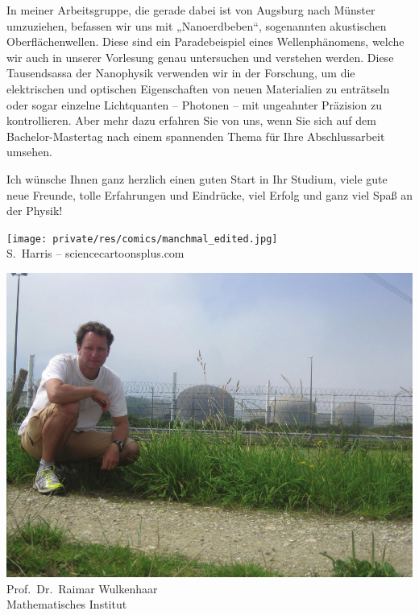 \begin{multicols}{2}
\begin{multicols}{2}
In meiner Arbeitsgruppe, die gerade dabei ist von Augsburg nach Münster umzuziehen, befassen wir uns mit „Nanoerdbeben“, sogenannten akustischen Oberflächenwellen. Diese sind ein Paradebeispiel eines Wellenphänomens, welche wir auch in unserer Vorlesung genau untersuchen und verstehen werden. Diese Tausendsassa der Nanophysik verwenden wir in der Forschung, um die elektrischen und optischen Eigenschaften von neuen Materialien zu enträtseln oder sogar einzelne Lichtquanten -- Photonen -- mit ungeahnter Präzision zu kontrollieren. Aber mehr dazu erfahren Sie von uns, wenn Sie sich auf dem Bachelor-Mastertag nach einem spannenden Thema für Ihre Abschlussarbeit umsehen. 🙂

Ich wünsche Ihnen ganz herzlich einen guten Start in Ihr Studium, viele gute neue Freunde, tolle Erfahrungen und Eindrücke, viel Erfolg und ganz viel Spaß an der Physik!

\begin{center}
\texttt{[image: private/res/comics/manchmal\_edited.jpg]}\\
{\footnotesize 
S.~Harris – sciencecartoonsplus.com}
\end{center}

\end{multicols}

\vfill

\newpage

\vspace*{\fill}

\begin{multicols}{2}
\begin{center}
\includegraphics[width=0.9\columnwidth]{res/vorstellungsfotos/wulkenhaar.png}\\
Prof.\ Dr.\ Raimar Wulkenhaar\\
Mathematisches Institut
\end{center}


\end{multicols}
\end{multicols}

